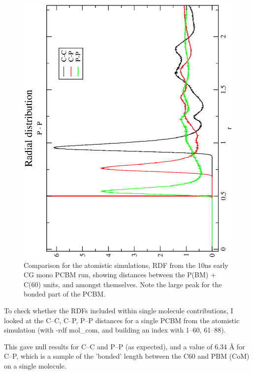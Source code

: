 \documentclass[hyperref]{labbook}
\begin{document}
\begin{figure}[h!]
\centering
\includegraphics[width=0.8\columnwidth,angle=270]{./figs/mono_CG_sims_CPC_rdf_comparison}
\caption{\label{mono_CG_sims_CPC_rdf_comparison}
Comparison for the atomistic simulations, RDF from the 10ns early CG mono PCBM run, showing distances between the P(BM) + C(60) units, and amongst themselves. Note the large peak for the bonded part of the PCBM.
}
\end{figure}



To check whether the RDFs included within single molecule contributions, I
looked at the C--C, C--P, P--P distances for a single PCBM from the atomistic
simulation (with -rdf mol\_com, and building an index with 1--60, 61--88).

This gave null results for C--C and P--P (as expected), and a value of 6.34 \AA
for C--P, which is a sample of the 'bonded' length between the C60 and PBM (CoM) on a single molecule.
\end{document}
